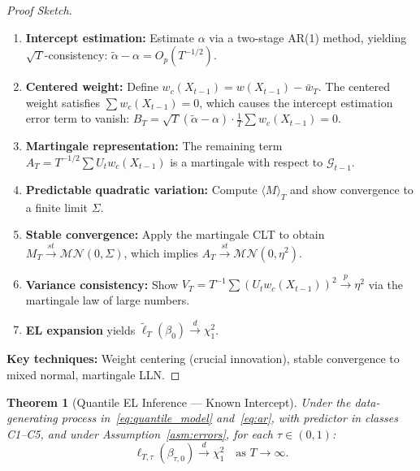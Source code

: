 \documentclass[11pt,a4paper]{article}
\newtheorem{theorem}{Theorem}[section]
\theoremstyle{definition}
\theoremstyle{remark}
\begin{document}
\begin{proof}[Proof Sketch]
\begin{enumerate}[leftmargin=*, label=\textbf{\arabic*}.]
    \item \textbf{Intercept estimation:}
    Estimate $\alpha$ via a two-stage AR(1) method, yielding
    $\sqrt{T}$-consistency: $\widetilde{\alpha} - \alpha = O_p(T^{-1/2})$.
    \item \textbf{Centered weight:}
    Define $w_c(X_{t-1}) = w(X_{t-1}) - \bar{w}_T$.
    The centered weight satisfies $\sum w_c(X_{t-1}) = 0$,
    which causes the intercept estimation error term to vanish:
    $B_T = \sqrt{T}(\widetilde{\alpha} - \alpha) \cdot \frac{1}{T}\sum w_c(X_{t-1}) = 0$.
    \item \textbf{Martingale representation:}
    The remaining term $A_T = T^{-1/2}\sum U_t w_c(X_{t-1})$ is a martingale with
    respect to $\mathcal{G}_{t-1}$.
    \item \textbf{Predictable quadratic variation:}
    Compute $\langle M \rangle_T$ and show convergence to a finite limit $\Sigma$.
    \item \textbf{Stable convergence:}
    Apply the martingale CLT to obtain $M_T \xrightarrow{st} \mathcal{MN}(0, \Sigma)$,
    which implies $A_T \xrightarrow{st} \mathcal{MN}(0, \eta^2)$.
    \item \textbf{Variance consistency:}
    Show $V_T = T^{-1}\sum (U_t w_c(X_{t-1}))^2 \xrightarrow{p} \eta^2$
    via the martingale law of large numbers.
    \item \textbf{EL expansion} yields $\widetilde{\ell}_T(\beta_0) \xrightarrow{d} \chi^2_1$.
\end{enumerate}
\textbf{Key techniques:} Weight centering (crucial innovation),
stable convergence to mixed normal, martingale LLN.
\end{proof}

\begin{theorem}[Quantile EL Inference --- Known Intercept]\label{thm:4}
Under the data-generating process in~\eqref{eq:quantile_model} and~\eqref{eq:ar},
with predictor in classes C1--C5, and under Assumption~\ref{asm:errors},
for each $\tau \in (0,1)$:
\begin{equation}
    \ell_{T,\tau}(\beta_{\tau,0}) \xrightarrow{d} \chi^2_1 \quad \text{as } T \to \infty.
\end{equation}
\end{theorem}
\end{document}
